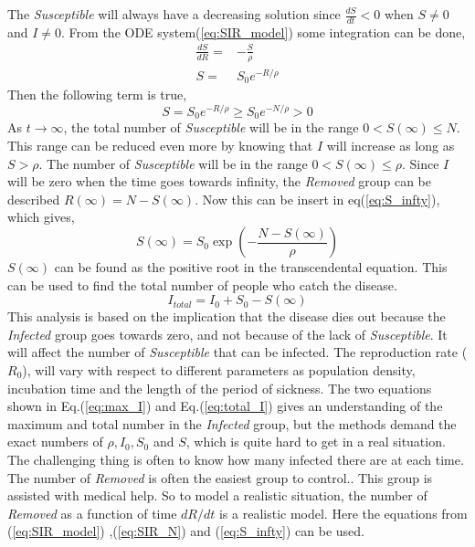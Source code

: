 \documentclass[%
twoside,                 %
final,                   %
10pt]{article}
\begin{document}
\vspace{3mm}




\vspace{3mm}


The \emph{Susceptible} will always have a decreasing solution since $\frac{dS}{dt} < 0$ when $S\neq0$ and $I\neq0$. From the ODE system(\ref{eq:SIR_model}) some integration can be done,
\begin{equation} \label{eq:S_infty}
	\begin{aligned}
	\frac{dS}{dR} =& -\frac{S}{\rho}\\
	S =& S_0e^{-R/\rho} 
	\end{aligned}
\end{equation}
Then the following term is true,
\begin{equation} 
S = S_0e^{-R/\rho} \geq S_0e^{-N/\rho} > 0
\end{equation}
As $t\rightarrow \infty$, the total number of \emph{Susceptible} will be in the range $0 < S(\infty)\leq N$. This range can be reduced even more by knowing that $I$ will increase as long as $S> \rho$. The number of \emph{Susceptible} will be in the range $0 < S(\infty)\leq \rho$. Since $I$ will be zero when the time goes towards infinity, the \emph{Removed} group can be described $R(\infty)= N -S(\infty)$. Now this can be insert in eq(\ref{eq:S_infty}), which gives,
\begin{equation}
S(\infty) = S_0 \exp\left(-\frac{N-S(\infty)}{\rho}\right)
\end{equation}
$S(\infty)$ can be found as the positive root in the transcendental equation. This can be used to find the total number of people who catch the disease.
\begin{equation} \label{eq:total_I}
I_{total} = I_0 + S_0 -S(\infty)
\end{equation}
This analysis is based on the implication that the disease dies out because the \emph{Infected} group goes towards zero, and not because of the lack of \emph{Susceptible}. It will affect the number of \emph{Susceptible} that can be infected. The reproduction rate ($R_0$), will vary with respect to different parameters as population density, incubation time and the length of the period of sickness. The two equations shown in Eq.(\ref{eq:max_I}) and Eq.(\ref{eq:total_I}) gives an understanding of the maximum and total number in the \emph{Infected} group, but the methods demand the exact numbers of $\rho,I_0,S_0$ and $S$, which is quite hard to get in a real situation. The challenging thing is often to know how many infected there are at each time. The number of \emph{Removed} is often the easiest group to control.. This group is assisted with medical help. So to model a realistic situation, the number of \emph{Removed} as a function of time $dR/dt$ is a realistic model. Here the equations from (\ref{eq:SIR_model}) ,(\ref{eq:SIR_N}) and (\ref{eq:S_infty}) can be used.
\end{document}
